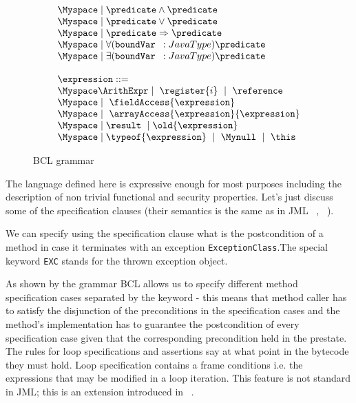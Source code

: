 \begin{figure}[!htbp]
$$\begin{array}{l}
       \Myspace \mid   \predicate \wedge \predicate \\
       \Myspace \mid   \predicate \vee \predicate \\
       \Myspace \mid   \predicate \Rightarrow \predicate \\
       \Myspace \mid   \forall (\texttt{boundVar } : JavaType )  \predicate \\
       \Myspace \mid   \exists(\texttt{boundVar } : JavaType )  \predicate \\
       \\ 
  \expression ::= \\  
      \Myspace  \ArithExpr  \mid  \ \register{i}  \  \mid  \ \reference \\
  	  \Myspace  \mid  \ \fieldAccess{\expression}  \\
  	  \Myspace  \mid \ \arrayAccess{\expression} {\expression}  \\
  	  \Myspace  \mid \result \ \mid \old{\expression}  \\
  	  \Myspace \mid \typeof{\expression}  \ \mid \ \Mynull \ \mid \  \this
\end{array}$$
\caption{BCL grammar}
 \label{bclGrammar}
 \end{figure}
 The language defined here is expressive enough for most purposes including the description of non trivial functional and 
 security properties. Let's just discuss some of the specification clauses 
 (their semantics is the same as in JML~\cite{RT03djml} , ~\cite{JMLRefMan}).
  
 We can specify using the specification clause  what is the postcondition of  a method in case it terminates with 
 an exception  \texttt{ExceptionClass}.The special keyword \texttt{EXC} stands for the thrown exception object.
 
As shown by the grammar BCL allows us to specify different method specification cases separated by the keyword  - this means that 
 method caller has to satisfy the disjunction of the preconditions in the specification cases  and the method's implementation 
 has to guarantee the postcondition of every specification case given that the corresponding precondition held in the prestate.
The rules for loop specifications and assertions  say at what point in the bytecode they must hold. Loop  specification 
contains a frame conditions i.e. the expressions that may be modified in a loop iteration. This feature is not standard in JML; this is an extension introduced in 
 ~\cite{BRL-JACK}. 
 

